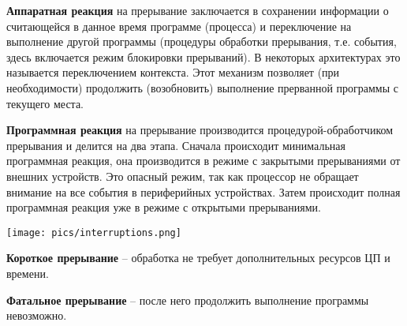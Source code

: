 \textbf{Аппаратная реакция} на прерывание заключается в сохранении информации о считающейся в данное время программе (процесса) и переключение на выполнение другой программы (процедуры обработки прерывания, т.е. события, здесь включается режим блокировки прерываний). В некоторых архитектурах это называется переключением контекста. Этот механизм позволяет (при необходимости) продолжить (возобновить) выполнение прерванной программы с текущего места.

\textbf{Программная реакция} на прерывание производится процедурой-обработчиком прерывания и делится на два этапа. Сначала происходит минимальная программная реакция, она производится в режиме с закрытыми прерываниями от внешних устройств. Это опасный режим, так как процессор не обращает внимание на все события в периферийных устройствах. Затем происходит полная программная реакция уже в режиме с открытыми прерываниями.

\texttt{[image: pics/interruptions.png]}

\textbf{Короткое прерывание} -- обработка не требует дополнительных ресурсов ЦП и времени.

\textbf{Фатальное прерывание} -- после него продолжить выполнение программы невозможно.


